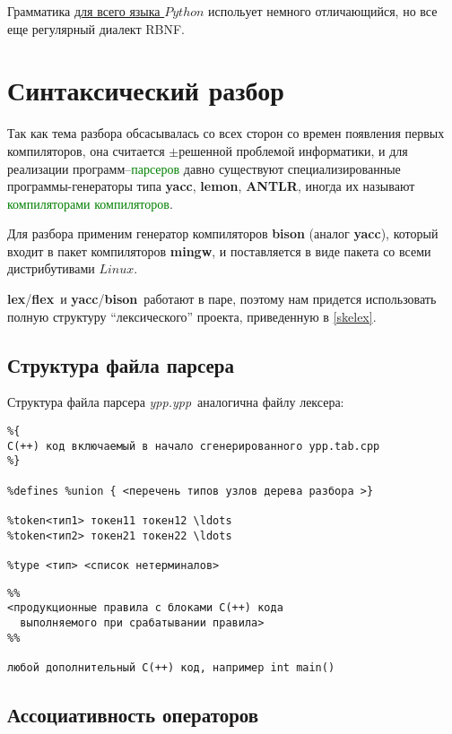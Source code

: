 \documentclass[oneside,10pt]{article}
\newcommand{\term}[1]{\textcolor{green}{#1}}
\newcommand{\py}{$Python$}
\newcommand{\linux}{$Linux$}
\newcommand{\prog}[1]{\textbf{#1}}
\newcommand{\file}[1]{\textit{#1}}
\newcommand{\flex}{\prog{flex}}
\newcommand{\lex}{\prog{lex}}
\newcommand{\yacc}{\prog{yacc}}
\newcommand{\bison}{\prog{bison}}
\begin{document}
Грамматика \href{http://docs.python.org/3/reference/grammar.html}{для всего
языка \py} испольует немного отличающийся, но все еще регулярный диалект RBNF.

\clearpage
\section{Синтаксический разбор}

Так как тема разбора обсасывалась со всех сторон со времен появления первых
компиляторов, она считается $\pm$решенной проблемой информатики, и для
реализации программ--\term{парсеров} давно существуют специализированные
программы-генераторы типа \prog{yacc}, \prog{lemon}, \prog{ANTLR}, иногда их
называют \term{компиляторами компиляторов}.

\bigskip
Для разбора применим генератор компиляторов \prog{bison} (аналог \prog{yacc}),
который входит в пакет компиляторов \prog{mingw}, и поставляется в виде пакета
со всеми дистрибутивами \linux.

\bigskip
\lex/\flex\ и \yacc/\bison\ работают в паре, поэтому нам придется использовать
полную структуру ``лексического'' проекта, приведенную в \ref{skelex}.

\subsection{Структура файла парсера}

Структура файла парсера \file{ypp.ypp}\ аналогична файлу лексера: 

\begin{verbatim}
%{
С(++) код включаемый в начало сгенерированного ypp.tab.cpp
%}

%defines %union { <перечень типов узлов дерева разбора >}

%token<тип1> токен11 токен12 \ldots
%token<тип2> токен21 токен22 \ldots

%type <тип> <список нетерминалов>
\end{verbatim}
\begin{verbatim}
%%
<продукционные правила c блоками С(++) кода
  выполняемого при срабатывании правила>
%%

любой дополнительный С(++) код, например int main()
\end{verbatim}

\clearpage
\subsection{Ассоциативность операторов}
\end{document}
